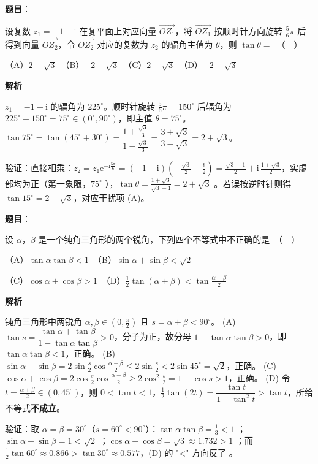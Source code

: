 \begin{answer}

\textbf{题目}：

设复数 $z_1 = -1 - \mathrm{i}$ 在复平面上对应向量 $\overrightarrow{OZ_1}$，将 $\overrightarrow{OZ_1}$ 按顺时针方向旋转 $\frac{5}{6}\pi$ 后得到向量 $\overrightarrow{OZ_2}$，令 $\overrightarrow{OZ_2}$ 对应的复数为 $z_2$ 的辐角主值为 $\theta$，则 $\tan\theta =$　（　）

（A）$2 - \sqrt{3}$　（B）$-2 + \sqrt{3}$　（C）$2 + \sqrt{3}$　（D）$-2 - \sqrt{3}$

\textbf{解析}

$z_1=-1-\mathrm i$ 的辐角为 $225^\circ$。顺时针旋转 $\frac56\pi=150^\circ$ 后辐角为 $225^\circ-150^\circ=75^\circ\in(0^\circ,90^\circ)$，即主值 $\theta=75^\circ$。
$\tan75^\circ=\tan(45^\circ+30^\circ)=\dfrac{1+\frac{\sqrt3}{3}}{1-\frac{\sqrt3}{3}}=\dfrac{3+\sqrt3}{3-\sqrt3}=2+\sqrt3$。

验证：直接相乘：$z_2=z_1\mathrm e^{-\mathrm i\frac{5\pi}{6}}=(-1-\mathrm i)\left(-\frac{\sqrt3}{2}-\frac{\mathrm i}{2}\right)=\frac{\sqrt3-1}{2}+\mathrm i\,\frac{1+\sqrt3}{2}$，实虚部均为正（第一象限，$75^\circ$ ），$\tan\theta=\frac{1+\sqrt3}{\sqrt3-1}=2+\sqrt3$ 。若误按逆时针则得 $\tan15^\circ=2-\sqrt3$，对应干扰项 (A)。


\end{answer}
\begin{answer}

\textbf{题目}：

设 $\alpha$，$\beta$ 是一个钝角三角形的两个锐角，下列四个不等式中不正确的是　（　）

（A）$\tan\alpha \tan\beta < 1$　（B）$\sin\alpha + \sin\beta < \sqrt{2}$

（C）$\cos\alpha + \cos\beta > 1$　（D）$\frac{1}{2}\tan(\alpha+\beta) < \tan\frac{\alpha+\beta}{2}$

\textbf{解析}

钝角三角形中两锐角 $\alpha,\beta\in(0,\frac\pi2)$ 且 $s=\alpha+\beta<90^\circ$。
(A) $\tan s=\dfrac{\tan\alpha+\tan\beta}{1-\tan\alpha\tan\beta}>0$，分子为正，故分母 $1-\tan\alpha\tan\beta>0$，即 $\tan\alpha\tan\beta<1$，正确。
(B) $\sin\alpha+\sin\beta=2\sin\frac s2\cos\frac{\alpha-\beta}{2}\le2\sin\frac s2<2\sin45^\circ=\sqrt2$，正确。
(C) $\cos\alpha+\cos\beta=2\cos\frac s2\cos\frac{\alpha-\beta}{2}\ge2\cos^2\frac s2=1+\cos s>1$，正确。
(D) 令 $t=\frac{\alpha+\beta}{2}\in(0,45^\circ)$，则 $0<\tan t<1$，$\frac12\tan(2t)=\dfrac{\tan t}{1-\tan^2 t}>\tan t$，所给不等式\textbf{不成立}。

验证：取 $\alpha=\beta=30^\circ$（$s=60^\circ<90^\circ$）：$\tan\alpha\tan\beta=\frac13<1$ ；$\sin\alpha+\sin\beta=1<\sqrt2$ ；$\cos\alpha+\cos\beta=\sqrt3\approx1.732>1$ ；而 $\frac12\tan60^\circ\approx0.866>\tan30^\circ\approx0.577$，(D) 的 "<" 方向反了 。


\end{answer}
